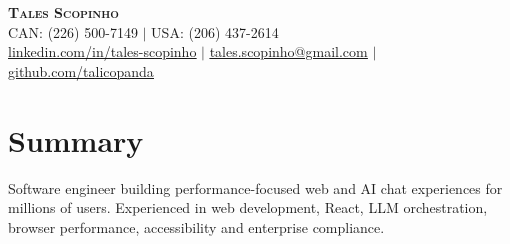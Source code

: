 \documentclass[letterpaper,11pt]{article}
\begin{document}
\begin{center}
  \textbf{\Huge \scshape Tales Scopinho} \\ \vspace{1pt}
  \normalfont CAN: (226) 500-7149 $|$ USA: (206) 437-2614 \\
  \href{https://linkedin.com/in/tales-scopinho}{\underline{linkedin.com/in/tales-scopinho}} $|$ \href{mailto:tales.scopinho@gmail.com}{\underline{tales.scopinho@gmail.com}} $|$ \href{https://github.com/talicopanda}{\underline{github.com/talicopanda}}
\end{center}

\section{Summary}
    Software engineer building performance-focused web and AI chat experiences for millions of users. Experienced in web development, React, LLM orchestration, browser performance, accessibility and enterprise compliance.
\end{document}

